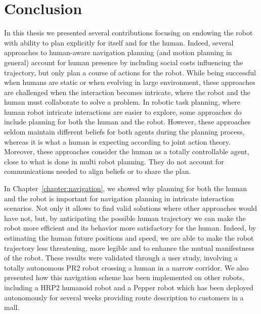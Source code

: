 \documentclass[a4paper,11pt,twoside]{StyleThese}
\begin{document}
\fi


\chapter*{Conclusion}

In this thesis we presented several contributions focusing on endowing the robot with ability to plan explicitly for itself and for the human. Indeed, several approaches to human-aware navigation planning (and motion planning in general) account for human presence by including social costs influencing the trajectory, but only plan a course of actions for the robot. While being successful when humans are static or when evolving in large environment, these approaches are challenged when the interaction becomes intricate, where the robot and the human must collaborate to solve a problem. In robotic task planning, where human robot intricate interactions are easier to explore, some approaches do include planning for both the human and the robot. However, these approaches seldom maintain different beliefs for both agents during the planning process, whereas it is what a human is expecting according to joint action theory. Moreover, these approaches consider the human as a totally controllable agent, close to what is done in multi robot planning. They do not account for communications needed to align beliefs or to share the plan.

In Chapter~\ref{chapter:navigation}, we showed why planning for both the human and the robot is important for navigation planning in intricate interaction scenarios. Not only it allows to find valid solutions where other approaches would have not, but, by anticipating the possible human trajectory we can make the robot more efficient and its behavior more satisfactory for the human.  Indeed, by estimating the human future positions and speed, we are able to make the robot trajectory less threatening, more legible and to enhance the mutual manifestness of the robot. These results were validated through a user study, involving a totally autonomous PR2 robot crossing a human in a narrow corridor. We also presented how this navigation scheme has been implemented on other robots, including a HRP2 humanoid robot and a Pepper robot which has been deployed autonomously for several weeks providing route description to customers in a mall.
\end{document}
